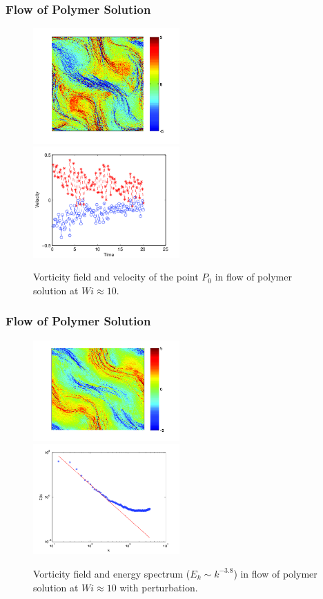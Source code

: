 \begin{frame}
  \frametitle{Flow of Polymer Solution}
  \begin{figure}[ht]
    \centering
    \includegraphics[width=0.5\textwidth]{img/polymer_loc-14.png}
    \includegraphics[width=0.5\textwidth]{img/polymer_loc-8.png}
    \caption{Vorticity field and velocity of the point $P_0$ in flow of polymer solution at $Wi\approx10$.}
    \label{fig:vor_pol10}
  \end{figure}
\end{frame}

\begin{frame}
 \frametitle{Flow of Polymer Solution}
  \begin{figure}[t]
    \centering
    \includegraphics[width=0.5\textwidth]{img/polymer_loc-11.png}
 \includegraphics[width=0.5\textwidth]{img/polymer_loc-0.png}
    \caption{Vorticity field and energy spectrum ($E_k\sim k^{-3.8}$) in flow of polymer solution at $Wi\approx10$ with perturbation.}
    \label{fig:vor_per}
  \end{figure}

\end{frame}

